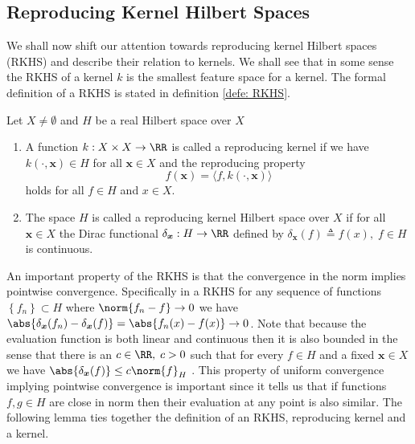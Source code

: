 \subsection{Reproducing Kernel Hilbert Spaces}\label{Section1.2}

We shall now shift our attention towards reproducing kernel Hilbert spaces (RKHS) and describe their relation to kernels. We shall see that in some sense the RKHS of a kernel $k$ is the smallest feature space for a kernel. The formal definition of a RKHS is stated in definition \ref{defe: RKHS}.

\begin{defe}[RKHS] \label{defe: RKHS}
    Let $X \neq \emptyset$ and $H$ be a real Hilbert space over $X$
    \begin{enumerate}
        \item A function $k : X \times X \to \RR$ is called a reproducing kernel if we have $k \left( \cdot, \bm{x} \right) \in H$ for all $\bm{x} \in X$ and the reproducing property
              \[
                  f(\bm{x}) = \langle f , k \left( \cdot, \bm{x} \right) \rangle
              \]
              holds for all $f \in H$ and $x \in X$.
        \item The space $H$ is called a reproducing kernel Hilbert space over $X$ if for all $\bm{x} \in X$ the Dirac functional $\delta_{\bm{x}} : H \to \RR$ defined by $\delta_{\bm{x}} (f) \triangleq f(x), \; f \in H$ is continuous.
    \end{enumerate}
    \cite{SteinwartIngo2008SVMb}
\end{defe}

An important property of the RKHS is that the convergence in the norm implies pointwise convergence. Specifically in a RKHS for any sequence of functions $\left\{ f_n \right\} \subset H$ where $\norm{f_n - f} \to 0$ we have $\abs{\delta_{\bm{x}} (f_n) - \delta_{\bm{x}} (f)} = \abs{f_n (x) - f (x)} \to 0$. Note that because the evaluation function is both linear and continuous then it is also bounded in the sense that there is an $c \in \RR, \; c > 0$ such that for every $f \in H$ and a fixed $\bm{x} \in X$ we have $\abs{\delta_{\bm{x}} (f)} \leq c \norm{f}_H$ \cite{BerezanskyMakarovich1996FaV1}. This property of uniform convergence implying pointwise convergence is important since it tells us that if functions $f,g \in H$ are close in norm then their evaluation at any point is also similar. The following lemma ties together the definition of an RKHS, reproducing kernel and a kernel.

